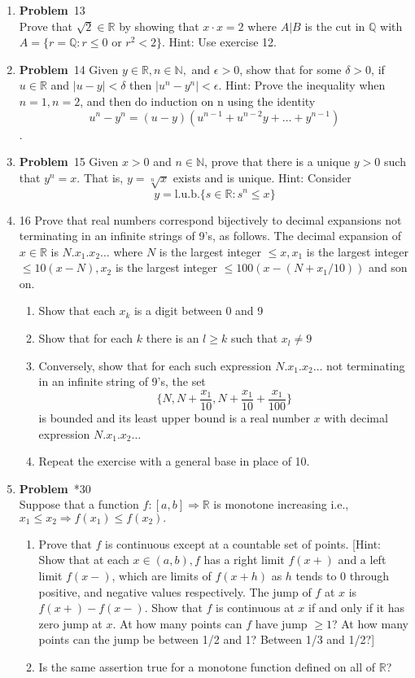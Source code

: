 \documentclass[12pt]{amsart}
\newcommand{\benu}{\begin{enumerate}}
\newcommand{\eenu}{\end{enumerate}}
\theoremstyle{definition}
\newcommand{\mbR}{\mathbb{R}}
\newcommand{\mbN}{\mathbb{N}}
\newcommand{\mbQ}{\mathbb{Q}}
\newcommand{\itep}{\item {\bfseries Problem}\ }
\begin{document}
\begin{enumerate}[series=p]
\newpage
\itep 13\\
Prove that $\sqrt{2} \in \mbR$ by showing that $x \cdot x = 2$ where $A|B$ is the cut in $\mbQ$ with $A = \{r = \mbQ: r \leq 0 \text{ or } r^2 < 2\}$.  Hint: Use exercise 12.

\newpage
\itep 14
Given $y \in \mbR, n \in \mbN,$ and $\epsilon > 0$, show that for some $\delta > 0$, if $u \in \mbR$ and $|u-y| < \delta$ then $|u^n - y^n| < \epsilon$.  Hint: Prove the inequality when $n = 1, n = 2$, and then do induction on n using the identity
$$u^n - y^n = (u-y)(u^{n-1} + u^{n-2}y + \dots + y^{n-1})$$.

\newpage
\itep 15
Given $x > 0$ and $n \in \mbN$, prove that there is a unique $y > 0$ such that $y^n = x$.  That is, $y = \sqrt[n]{x}$ exists and is unique.  Hint: Consider
$$y = \text{l.u.b.}\{s \in \mbR : s^n \leq x\}$$

\newpage
\item 16
Prove that real numbers correspond bijectively  to decimal expansions not terminating in an infinite strings of 9's, as follows.  The decimal expansion of $x \in \mbR$ is $N.x_1.x_2\dots$ where $N$ is the largest integer $\leq x, x_1$ is the largest integer $\leq 10(x-N), x_2$ is the largest integer $\leq 100(x-(N+x_1/10))$ and son on.
\\
\benu
\item Show that each $x_k$ is a digit between 0 and 9
\\
\item Show that for each $k$ there is an $l \geq k$ such that $x_l \neq 9$
\\
\item Conversely, show that for each such expression $N.x_1.x_2\dots$ not terminating in an infinite string of 9's, the set
$$ \{N, N + \frac{x_1}{10}, N + \frac{x_1}{10} + \frac{x_1}{100}\}$$
is bounded and its least upper bound is a real number $x$ with decimal expression $N.x_1.x_2\dots$
\\
\item Repeat the exercise with a general base in place of 10.
\eenu

\newpage
\itep *30\\
Suppose that a function $f : [a,b] \Rightarrow \mbR$ is monotone increasing i.e., $x_1 \leq x_2 \Rightarrow f(x_1) \leq f(x_2).$
\benu
\item Prove that $f$ is continuous except at a countable set of points.  [Hint: Show that at each $x \in (a,b), f$ has a right limit $f(x+)$ and a left limit $f(x-)$, which are limits of $f(x+h)$ as $h$ tends to 0 through positive, and negative values respectively.  The jump of $f$ at $x$ is $f(x+) - f(x-)$.  Show that $f$ is continuous at $x$ if and only if it has zero jump at $x$.  At how many points can $f$ have jump $\geq 1$?  At how many points can the jump be between 1/2 and 1?  Between 1/3 and 1/2?]
\\
\item Is the same assertion true for a monotone function defined on all of $\mbR$?
\\
\eenu


\end{enumerate}
\end{document}
